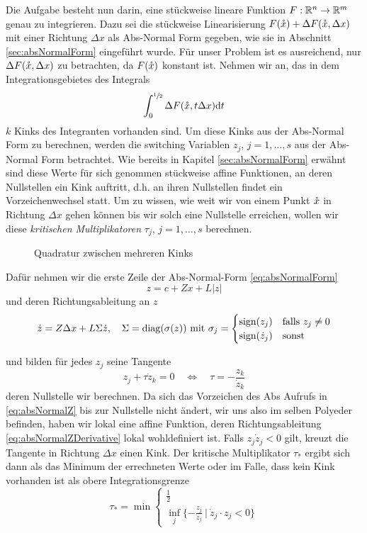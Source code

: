 Die Aufgabe besteht nun darin, eine stückweise lineare Funktion $F:\mathbb{R}^n \to \mathbb{R}^m$ genau zu integrieren. Dazu sei die stückweise Linearisierung $F(\mathring{x}) + \Delta F(\mathring{x},\Delta x)$ mit einer Richtung $\Delta x$ als Abs-Normal Form gegeben, wie sie in Abschnitt \ref{sec:absNormalForm} eingeführt wurde. 
Für unser Problem ist es ausreichend, nur $\Delta F(\mathring{x},\Delta x)$ zu betrachten, da $F(\mathring{x})$ konstant ist.
Nehmen wir an, das in dem Integrationsgebietes des Integrals
\begin{equation}
\label{eq:quadInitialProblem}
 \int_0^{\sfrac{1}{2}} \Delta F(\mathring{x},t\Delta x) \text{d}t
\end{equation}
$k$ Kinks des Integranten vorhanden sind. 
Um diese Kinks aus der Abs-Normal Form zu berechnen, werden die switching Variablen $z_j$, $j=1,\dots,s$ aus der Abs-Normal Form betrachtet. Wie bereits in Kapitel \ref{sec:absNormalForm} erwähnt sind diese Werte für sich genommen stückweise affine Funktionen, an deren Nullstellen ein Kink auftritt,
d.h. an ihren Nullstellen findet ein Vorzeichenwechsel statt. Um zu wissen, wie weit wir von einem Punkt $\mathring{x}$ in Richtung $\Delta x$ gehen können bis wir solch eine Nullstelle erreichen, wollen wir diese \textit{kritischen Multiplikatoren} $\tau_j$, $j=1,\ldots, s$ berechnen. 
\begin{figure}[H]
\centering
 
 \caption{Quadratur zwischen mehreren Kinks}
\label{fig:quadrature} 
\end{figure}
Dafür nehmen wir die erste Zeile der Abs-Normal-Form \eqref{eq:absNormalForm}
\begin{equation}
\label{eq:absNormalZ}
 z = c+Zx + L|z|
\end{equation}
und deren Richtungsableitung an $z$
\begin{equation}
\label{eq:absNormalZDerivative}
 \dot z = Z\Delta x + L\Sigma \dot z, \quad
 \Sigma  = \operatorname{diag}(\sigma(z)) ~ \text{mit } \sigma_j =  \begin{cases}
            \text{sign}(z_j) & \text{falls } z_j\neq 0\\
            \text{sign}(\dot z_j) &  \text{sonst}
           \end{cases}
\end{equation}

und bilden für jedes $z_j$ seine Tangente
\[
 z_j + \tau \dot z_k = 0 \quad \Leftrightarrow \quad \tau =- \frac{z_k}{\dot z_k}
\]
deren Nullstelle wir berechnen. Da sich das Vorzeichen des Abs Aufrufs in \eqref{eq:absNormalZ} bis zur Nullstelle nicht ändert, wir uns also im selben Polyeder befinden, haben wir lokal eine affine Funktion, deren Richtungsableitung \eqref{eq:absNormalZDerivative} lokal wohldefiniert ist.
Falls $z_j\dot z_j <0$ gilt, kreuzt die Tangente in Richtung $\Delta x$ einen Kink.
Der kritische Multiplikator $\tau_*$ ergibt sich dann als das Minimum der errechneten Werte oder im Falle, dass kein Kink vorhanden ist als obere Integrationsgrenze
\[
 \tau_* = \min \begin{cases}
		\frac{1}{2}\\
		\inf_j\lbrace -\frac{z_j}{\dot z_j}~ \vert ~ \dot z_j \cdot z_j <0 \rbrace
	       \end{cases}
\]

